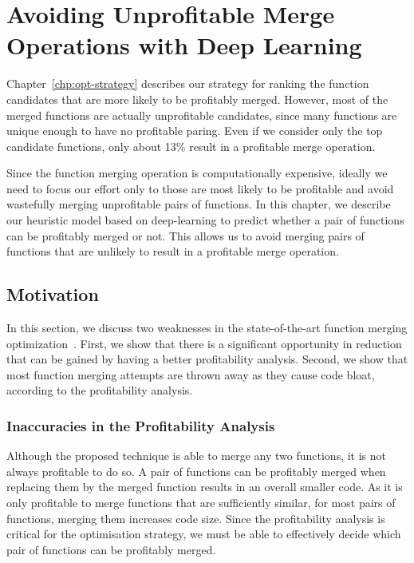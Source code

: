 
\chapter{Avoiding Unprofitable Merge Operations with Deep Learning} \label{chp:deeplearning}

Chapter~\ref{chp:opt-strategy} describes our strategy for ranking the function candidates that are more likely to be profitably merged.
However, most of the merged functions are actually unprofitable candidates, since many functions are unique enough to have no profitable paring.
Even if we consider only the top candidate functions, only about 13\% result in a profitable merge operation.

Since the function merging operation is computationally expensive, ideally we need to focus our effort only to those are most likely to be profitable and avoid wastefully merging unprofitable pairs of functions.
In this chapter, we describe our heuristic model based on deep-learning to predict whether a pair of functions can be
profitably merged or not.
This allows us to avoid merging pairs of functions that are unlikely to result in a profitable merge operation.

\section{Motivation} \label{sec:deeplearning:motivation}

In this section, we discuss two weaknesses in the state-of-the-art function merging optimization~\cite{rocha20}.
First, we show that there is a significant opportunity in reduction that can be gained by having a better profitability analysis.
Second, we show that most function merging attempts are thrown away as they cause code bloat, according to the profitability analysis.

\subsection{Inaccuracies in the Profitability Analysis}

Although the proposed technique is able to merge any two functions, it is not always profitable to do so.
A pair of functions can be profitably merged when replacing them by the merged function results in an overall smaller code.
As it is only profitable to merge functions that are sufficiently similar, for most pairs of functions, merging them increases code size.
Since the profitability analysis is critical for the optimisation strategy, we must be able to effectively decide which pair of functions can be profitably merged.

